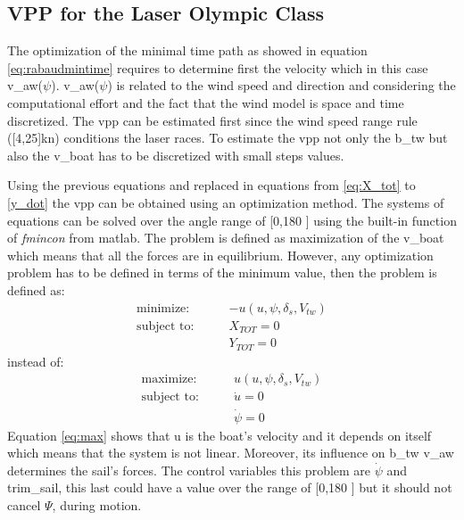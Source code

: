 \subsection{ VPP for the Laser Olympic Class}
The optimization of the minimal time path as showed in equation \ref{eq:rabaudmintime} requires to determine first the velocity which in this case \acrshort{v_aw}($\psi$). \acrshort{v_aw}($\psi$) is related to the wind speed and direction and considering the computational effort and the fact that the wind model is space and time discretized. The \acrshort{vpp} can be estimated first since the wind speed range rule ([4,25]kn) conditions the laser races. To estimate the \acrshort{vpp} not only the \acrshort{b_tw} but also the \acrshort{v_boat} has to be discretized with small steps values. \par \noindent 
Using the previous equations and replaced in equations from \ref{eq:X_tot} to \ref{y_dot} the \acrshort{vpp} can be obtained using an optimization method. The systems of equations can be solved over the angle range of [0,180 \degree] using the built-in function of \textit{fmincon} from \acrshort{matlab}\cite{rein2012tra}. The problem is defined as maximization of the \acrshort{v_boat} which means that all the forces are in equilibrium. However, any  optimization problem has to be defined in terms of the minimum value, then the problem is defined as:
\begin{align}
    \text{minimize:}\qquad & -u(u,\psi,\delta_{s},V_{tw})  \label{eq:max}\\
\text{subject to:} \qquad & X_{TOT}=0 \\
 \qquad & Y_{TOT}=0
\end{align} \label{eq:opt_vpp2}
instead of: 
\begin{align}
    \text{maximize:}\qquad & u(u,\psi,\delta_{s},V_{tw})  \label{eq:max2}\\
\text{subject to:} \qquad & \Dot{u}=0 \\
& \Dot{\psi}=0
\end{align} \label{eq:opt_vpp}
Equation \ref{eq:max} shows that \acrshort{u} is the boat's velocity and it depends on itself which means that the system is not linear. Moreover, its influence on \acrshort{b_tw} \acrshort{v_aw} determines the sail's forces. The control variables this problem are $\Dot{\psi}$ and \acrshort{trim_sail}, this last could have a value over the range of [0,180 \degree] but it should not cancel $\Psi$, during motion.
